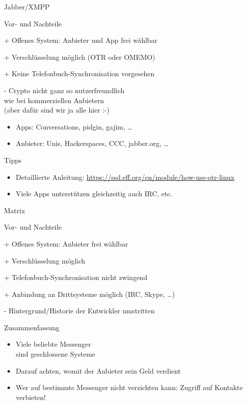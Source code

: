 \begin{frame}{Jabber/XMPP}
  \begin{blex}{Vor- und Nachteile}
    \item[+] Offenes System: Anbieter und App frei wählbar
    \item[+] Verschlüsselung möglich (OTR oder OMEMO)
    \item[+] Keine Telefonbuch-Synchronisation vorgesehen
    \item[-] Crypto nicht ganz so nutzerfreundlich\\wie bei kommerziellen Anbietern\\(aber dafür sind wir ja alle hier :-)
  \end{blex}
  \begin{itemize}
    \item Apps: Conversations, pidgin, gajim, \ldots
    \item Anbieter: Unis, Hackerspaces, CCC, jabber.org, \ldots
  \end{itemize}
  \begin{block}{Tipps}
    \begin{itemize}
      \item Detaillierte Anleitung: {\small\url{https://ssd.eff.org/en/module/how-use-otr-linux}}
      \item Viele Apps unterstützen gleichzeitig auch IRC, etc.
    \end{itemize}
  \end{block}
\end{frame}

\begin{frame}{Matrix}
  \begin{blex}{Vor- und Nachteile}
    \item[+] Offenes System: Anbieter frei wählbar
    \item[+] Verschlüsselung möglich
    \item[+] Telefonbuch-Synchronisation nicht zwingend
    \item[+] Anbindung an Drittsysteme möglich (IRC, Skype, \ldots)
    \item[-] Hintergrund/Historie der Entwickler umstritten
  \end{blex}
\end{frame}

\begin{frame}{Zusammenfassung}
  \begin{itemize}
    \item Viele beliebte Messenger\\ sind geschlossene Systeme
    \item Darauf achten, womit der Anbieter sein Geld verdient
    \item Wer auf bestimmte Messenger nicht verzichten kann: Zugriff auf Kontakte verbieten!
  \end{itemize}
\end{frame}

